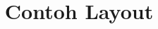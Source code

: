 \documentclass[a4paper,12pt,oneside]{article}
\begin{document}
\title{Contoh Layout}
\maketitle

\blindtext
\end{document}

